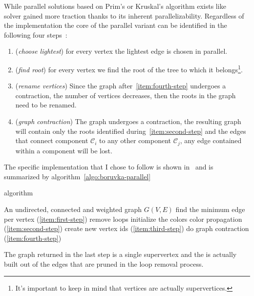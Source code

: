 \documentclass[a4paper,10pt]{article}
\begin{document}
While parallel solutions based on Prim's or Kruskal's algorithm exists like~\cite{prim-parallel}~\cite{filter-kruskal} \brkas solver gained more traction thanks to its inherent parallelizability. Regardless of the implementation the core of the parallel variant can be identified in the following four steps~\cite{boruvka-steps}:
\begin{enumerate}
	\item\label{item:first-step} (\textit{choose lightest}) for every vertex the lightest edge is chosen in parallel.
	\item\label{item:second-step} (\textit{find root}) for every vertex we find the root of the tree to which it belongs\footnote{It's important to keep in mind that vertices are actually supervertices.}.
	\item\label{item:third-step} (\textit{rename vertices}) Since the graph after~\ref{item:fourth-step} undergoes a contraction, the number of vertices decreases, then the roots in the graph need to be renamed.
	\item\label{item:fourth-step} (\textit{graph contraction}) The graph undergoes a contraction, the resulting graph will contain only the roots identified during~\ref{item:second-step} and the edges that connect component $\mathcal{C}_i$ to any other component $\mathcal{C}_j$, any edge contained within a component will be lost.
\end{enumerate}

The specific implementation that I chose to follow is shown in~\cite{generic-he-boruvka} and is summarized by algorithm~\ref{algo:boruvka-parallel}

\begin{algorithm}
	\caption{\brkas algorithm}\label{algo:boruvka-parallel}
	\begin{algorithmic}[1]
		\REQUIRE An undirected, connected and weighted graph $G(V, E)$
		\STATE find the minimum edge per vertex (\ref{item:first-step})
		\STATE remove loops
		\STATE initialize the colors
		\STATE color propagation (\ref{item:second-step})
		\ENDWHILE
		\STATE create new vertex ids (\ref{item:third-step})
		\STATE do graph contraction (\ref{item:fourth-step})
		\ENDWHILE
	\end{algorithmic}
\end{algorithm}

The graph returned in the last step is a single supervertex and the \mst is actually built out of the edges that are pruned in the loop removal process.
\end{document}
